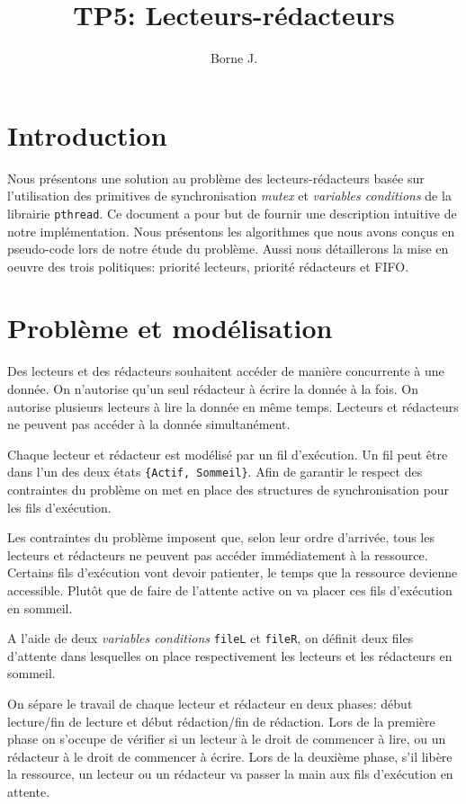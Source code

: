 \documentclass[11pt]{article}
\author{Borne J.}
\date{}
\title{TP5: Lecteurs-rédacteurs}
\theoremstyle{definition}
\theoremstyle{definition}
\begin{document}
\maketitle
\section{Introduction}
Nous présentons une solution au problème des lecteurs-rédacteurs basée sur l'utilisation des primitives de synchronisation 
\textit{mutex} et \textit{variables conditions} de la librairie \texttt{pthread}. Ce document a pour but de fournir une description intuitive de notre implémentation. Nous présentons les algorithmes que nous avons conçus en pseudo-code lors de notre étude du problème. Aussi nous détaillerons la mise en oeuvre des trois politiques: priorité lecteurs, priorité rédacteurs et FIFO.

\section{Problème et modélisation}
Des lecteurs et des rédacteurs souhaitent accéder de manière concurrente à une donnée.
On n'autorise qu'un seul rédacteur à écrire la donnée à la fois.
On autorise plusieurs lecteurs à lire la donnée en même temps.
Lecteurs et rédacteurs ne peuvent pas accéder à la donnée simultanément.

Chaque lecteur et rédacteur est modélisé par un fil d'exécution.
Un fil peut être dans l'un des deux états \texttt{\{Actif, Sommeil\}}.
Afin de garantir le respect des contraintes du problème on met en place des
structures de synchronisation pour les fils d'exécution.

Les contraintes du problème imposent que, selon leur ordre d'arrivée, tous les lecteurs et rédacteurs ne peuvent pas accéder immédiatement à la ressource. Certains fils d'exécution vont devoir patienter, le temps que la ressource devienne accessible. Plutôt que de faire de l'attente active on va placer ces fils d'exécution en sommeil.

A l'aide de deux \textit{variables conditions} \texttt{fileL} et \texttt{fileR}, on définit deux files d'attente dans lesquelles on place respectivement les lecteurs et les rédacteurs en sommeil.

On sépare le travail de chaque lecteur et rédacteur en deux phases: début lecture/fin de lecture et début rédaction/fin de rédaction.
Lors de la première phase on s'occupe de vérifier si un lecteur à le droit de commencer
à lire, ou un rédacteur à le droit de commencer à écrire. Lors de la deuxième phase, s'il libère la ressource, un lecteur ou un rédacteur va passer la main aux fils d'exécution en attente.
\end{document}
